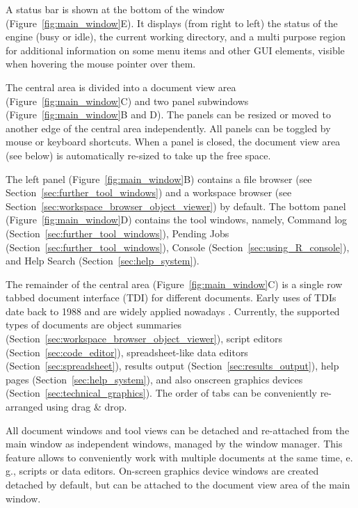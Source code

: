 A status bar is shown at the bottom of the window (Figure~\ref{fig:main_window}E). It displays (from
right to left) the status of the  engine (busy or idle), the
current working directory, and a multi purpose region for additional
information on some menu items and other GUI elements, visible when
hovering the mouse pointer over them.

The central area is divided into a document view area
(Figure~\ref{fig:main_window}C) and two panel subwindows
(Figure~\ref{fig:main_window}B and D). The panels can be resized or moved to
another edge of the central area independently. All panels can be
toggled by mouse or keyboard shortcuts. When a panel is closed, the
document view area (see below) is automatically re-sized to take up the
free space.

The left panel (Figure~\ref{fig:main_window}B) contains a file browser (see Section~\ref{sec:further_tool_windows}) and a
workspace browser (see Section~\ref{sec:workspace_browser_object_viewer}) by default. The
bottom panel (Figure~\ref{fig:main_window}D) contains the tool windows, namely, Command
log (Section~\ref{sec:further_tool_windows}), Pending Jobs (Section~\ref{sec:further_tool_windows}),  Console
(Section~\ref{sec:using_R_console}), and Help Search (Section~\ref{sec:help_system}).

The remainder of the central area (Figure~\ref{fig:main_window}C) is a single row tabbed document
interface (TDI) for different documents. Early uses of TDIs date back to 1988 and are
widely applied nowadays \citep{Hopkins2005, MDN2010,
KimLutteroth2010}. Currently, the supported types of
documents are object summaries (Section~\ref{sec:workspace_browser_object_viewer}), 
script editors (Section~\ref{sec:code_editor}), spreadsheet-like data editors 
(Section~\ref{sec:spreadsheet}), results output (Section~\ref{sec:results_output}), 
help pages (Section~\ref{sec:help_system}), and also
 onscreen graphics devices (Section~\ref{sec:technical_graphics}). 
The order of tabs can be conveniently re-arranged
using drag \& drop.

All document windows and tool views can be detached and re-attached from the main
window as independent windows, managed by the window manager. This feature allows to 
conveniently work with multiple documents
at the same time, e.\,g., scripts or data editors. On{}-screen
graphics device windows are created detached by default, but can 
be attached to the document view area of the main window.

